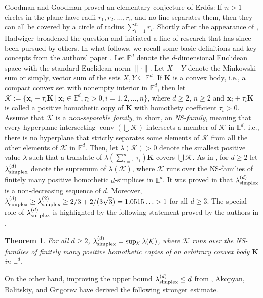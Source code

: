 \documentclass[12pt]{article}
\newtheorem{thm}{Theorem}
\DeclareMathOperator{\conv}{conv}
\newcommand{\xx}{\mathbf{x}}
\newcommand{\K}{\mathcal{K}}
\newcommand{\KK}{\mathbf K}
\newcommand{\Ee}{{\mathbb E}}
\begin{document}
Goodman and Goodman \cite{GG45} proved an elementary conjecture of Erd\H os: If $n>1$ circles in the plane have radii $r_1, r_2, \dots , r_n$ and no line separates them, then they can all be covered by a circle of radius $\sum_{i=1}^n r_i$. Shortly after the appearance of \cite{GG45}, Hadwiger \cite{Had} broadened the question and initiated a line of research that has since been pursued by others. In what follows, we recall some basic definitions and key concepts from the authors' paper \cite{BezLan16}. Let $\Ee^d$ denote the $d$-dimensional Euclidean space with the standard Euclidean norm $\|\cdot\|$. Let $X+Y$ denote the Minkowski sum or simply, vector sum of the sets $X, Y\subseteq \Ee^d$. If $\KK$ is a convex body, i.e., a compact convex set with nonempty interior in $\Ee^d$, then let $\K := \{ \xx_i + \tau_i \KK\ |\  \xx_i\in \Ee^d, \tau_i>0, i=1,2,\ldots, n\}$, where $d\ge 2$, $n\ge 2$ and $\xx_i + \tau_i \KK$ is called a positive homothetic copy of $\KK$ with homothety coefficient $\tau_i>0$. Assume that $\K$ is a {\it non-separable family}, in short, an {\it NS-family}, meaning that every hyperplane intersecting $\conv \left( \bigcup \K \right)$ intersects a member of $\K$ in $\Ee^d$, i.e., there is no hyperplane that strictly separates some elements of $\K$ from all the other elements of $\K$ in $\Ee^d$. Then, let $\lambda(\K) > 0$ denote the smallest positive value $\lambda$ such that a translate of
$\lambda \left( \sum_{i=1}^n \tau_i \right) \KK$ covers $\bigcup \K$. As in \cite{BezLan16}, for $d \geq 2$ let $\lambda_{\rm simplex}^{(d)}$ denote the supremum of $\lambda(\K)$, where $\K$ runs over the NS-families of finitely many positive homothetic $d$-simplices in $\Ee^d$. It was proved in \cite{BezLan16} that $\lambda_{\rm simplex}^{(d)}$ is a non-decreasing sequence of $d$. Moreover, $\lambda_{\rm simplex}^{(d)} \geq \lambda_{\rm simplex}^{(2)}\geq 2/3+2/(3\sqrt{3})= 1.0515\ldots>1$ for all $d\ge 3$. The special role of $\lambda_{\rm simplex}^{(d)}$ is highlighted by the following statement proved by the authors in \cite{BezLan16}.

\begin{thm}\label{simplex bound}
For all $d\ge 2$, $\lambda_{\rm simplex}^{(d)}=\sup_{\K} \lambda(\K)$, where $\K$ runs over the NS-families of finitely many positive homothetic copies of an arbitrary convex body $\KK$ in $\Ee^d$.
\end{thm}

On the other hand, improving the upper bound $\lambda_{\rm simplex}^{(d)}\leq d$ from \cite{BezLan16}, Akopyan, Balitskiy, and Grigorev \cite{ABG} have derived the following stronger estimate. 
\end{document}

